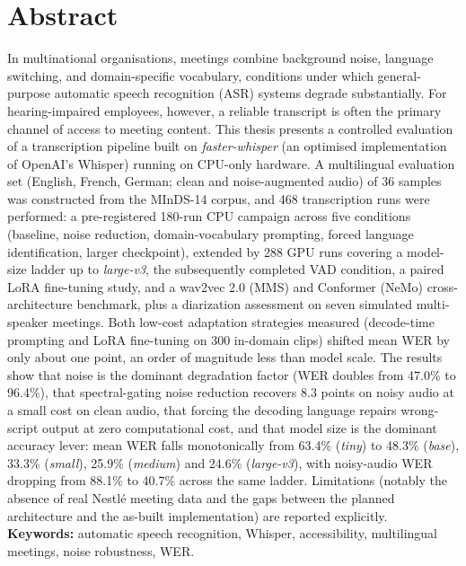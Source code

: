 \documentclass[12pt]{report}
\begin{document}
\section*{Abstract}
In multinational organisations, meetings combine background noise, language switching, and domain-specific vocabulary, conditions under which general-purpose automatic speech recognition (ASR) systems degrade substantially. For hearing-impaired employees, however, a reliable transcript is often the primary channel of access to meeting content. This thesis presents a controlled evaluation of a transcription pipeline built on \textit{faster-whisper} (an optimised implementation of OpenAI's Whisper) running on CPU-only hardware. A multilingual evaluation set (English, French, German; clean and noise-augmented audio) of 36 samples was constructed from the MInDS-14 corpus, and 468 transcription runs were performed: a pre-registered 180-run CPU campaign across five conditions (baseline, noise reduction, domain-vocabulary prompting, forced language identification, larger checkpoint), extended by 288 GPU runs covering a model-size ladder up to \textit{large-v3}, the subsequently completed VAD condition, a paired LoRA fine-tuning study, and a wav2vec 2.0 (MMS) and Conformer (NeMo) cross-architecture benchmark, plus a diarization assessment on seven simulated multi-speaker meetings. Both low-cost adaptation strategies measured (decode-time prompting and LoRA fine-tuning on 300 in-domain clips) shifted mean WER by only about one point, an order of magnitude less than model scale. The results show that noise is the dominant degradation factor (WER doubles from 47.0\% to 96.4\%), that spectral-gating noise reduction recovers 8.3 points on noisy audio at a small cost on clean audio, that forcing the decoding language repairs wrong-script output at zero computational cost, and that model size is the dominant accuracy lever: mean WER falls monotonically from 63.4\% (\textit{tiny}) to 48.3\% (\textit{base}), 33.3\% (\textit{small}), 25.9\% (\textit{medium}) and 24.6\% (\textit{large-v3}), with noisy-audio WER dropping from 88.1\% to 40.7\% across the same ladder. Limitations (notably the absence of real Nestlé meeting data and the gaps between the planned architecture and the as-built implementation) are reported explicitly.
\\
\textbf{Keywords:} automatic speech recognition, Whisper, accessibility, multilingual meetings, noise robustness, WER.
\thispagestyle{fancy}
\setcounter{page}{6}
\newpage
{}
\setcounter{page}{7}
\thispagestyle{fancy}
\newpage
\listoffigures
\thispagestyle{fancy}
\newpage
\listoftables
\thispagestyle{fancy}
\newpage
{}
\end{document}
